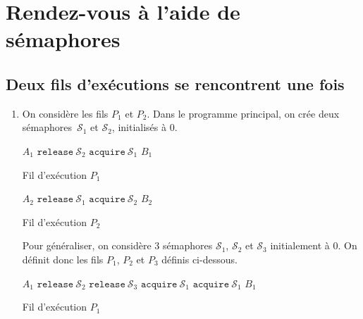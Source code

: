 \section{Rendez-vous à l'aide de sémaphores}

\subsection{Deux fils d'exécutions se rencontrent une fois}

\begin{enumerate}
	\item
		On considère les fils $P_1$ et $P_2$. Dans le programme principal, on crée deux sémaphores~$\mathcal{S}_1$ et $\mathcal{S}_2$, initialisés à $0$.
		\begin{multicols}{2}
			\begin{algorithm}[H]
				\centering
				\begin{algorithmic}[1]
					\State $A_1$
					\State $\texttt{release}\ \mathcal{S}_2$
					\State $\texttt{acquire}\ \mathcal{S}_1$
					\State $B_1$
				\end{algorithmic}
				\caption{Fil d'exécution $P_1$}
			\end{algorithm}
			\begin{algorithm}[H]
				\centering
				\begin{algorithmic}[1]
					\State $A_2$
					\State $\texttt{release}\ \mathcal{S}_1$
					\State $\texttt{acquire}\ \mathcal{S}_2$
					\State $B_2$
				\end{algorithmic}
				\caption{Fil d'exécution $P_2$}
			\end{algorithm}
		\end{multicols}
		Pour généraliser, on considère 3 sémaphores $\mathcal{S}_1$, $\mathcal{S}_2$ et $\mathcal{S}_3$ initialement à $0$. On définit donc les fils $P_1$, $P_2$ et $P_3$ définis ci-dessous.
		\begin{multicols}{3}
			\begin{algorithm}[H]
				\centering
				\begin{algorithmic}[1]
					\State $A_1$
					\State $\texttt{release}\ \mathcal{S}_2$
					\State $\texttt{release}\ \mathcal{S}_3$
					\State $\texttt{acquire}\ \mathcal{S}_1$
					\State $\texttt{acquire}\ \mathcal{S}_1$
					\State $B_1$
				\end{algorithmic}
				\caption{Fil d'exécution $P_1$}
			\end{algorithm}
			\begin{algorithm}[H]
				\centering
				\begin{algorithmic}[1]

\end{algorithmic}
\end{algorithm}
\end{multicols}
\end{enumerate}
